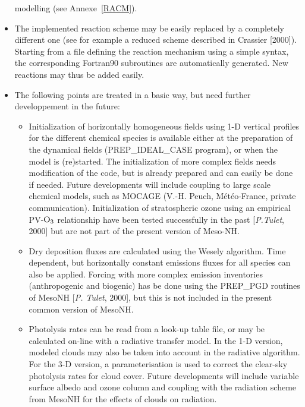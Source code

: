 \begin{itemize}
      modelling  (see Annexe~\ref{RACM}).
\item The implemented reaction scheme may be easily replaced by a
      completely different one (see for example a reduced scheme described
      in Crassier {\etal} [2000]).
      Starting from a file defining the reaction mechanism
      using a simple syntax, the corresponding Fortran90 subroutines
      are automatically generated. New reactions may thus be added easily.
\item The following points are treated in a basic way,
      but need further developpement in the future:
  \begin{itemize}
    \item Initialization of horizontally homogeneous fields using 1-D vertical 
        profiles for the different chemical species is available
        either at the preparation of the dynamical fields
        (PREP\_IDEAL\_CASE program), or when the model is (re)started.
        The initialization of more complex fields needs modification
        of the code, but is already prepared and can easily be done
        if needed. Future developments will include coupling to large
        scale chemical models, such as MOCAGE
        (V.-H. Peuch, M\'et\'eo-France, private communication).
        Initialization of stratospheric ozone using an empirical
        PV-$\rm O_3$ relationship have been tested successfully in
        the past [{\it P.Tulet}, 2000] but are not part of the present version
        of Meso-NH.
    \item Dry deposition fluxes are calculated using the
        Wesely algorithm.
        Time dependent, but horizontally constant emissions fluxes
        for all species can also be applied.
        Forcing with more complex emission inventories (anthropogenic
        and biogenic) has be done using the PREP\_PGD routines of MesoNH 
        [{\it P. Tulet}, 2000],
        but this is not included in the present common version of MesoNH.
    \item Photolysis rates can be read from a look-up table file,
        or may be calculated on-line with a radiative transfer model.
        In the 1-D version, modeled clouds may also be taken into
        account in the radiative algorithm. For the 3-D version, a 
        parameterisation is used to correct the clear-sky photolysis rates for
        cloud cover. Future developments will include 
        variable surface albedo and ozone column and coupling with
        the radiation scheme from MesoNH for the effects of
        clouds on radiation.

\end{itemize}
\end{itemize}
